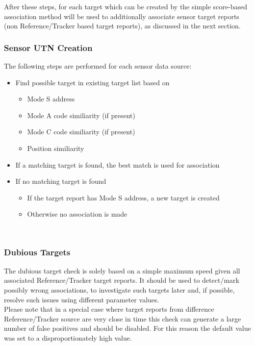 After these steps, for each target which can be created by the simple score-based association method will be used to additionally associate sensor target reports (non Reference/Tracker based target reports), as discussed in the next section.

\subsubsection{Sensor UTN Creation}



The following steps are performed for each sensor data source:
\begin{itemize}
\item Find possible target in existing target list based on
\begin{itemize}
\item Mode S address
\item Mode A code similiarity (if present)
\item Mode C code similiarity (if present)
\item Position similiarity
\end{itemize}
\item If a matching target is found, the best match is used for association
\item If no matching target is found
\begin{itemize}
\item If the target report has Mode S address, a new target is created
\item Otherwise no association is made
\end{itemize}
\end{itemize}
\ \\

\subsubsection{Dubious Targets}

The dubious target check is solely based on a simple maximum speed given all associated Reference/Tracker target reports. It should be used to detect/mark possibly wrong associations, to investigate such targets later and, if possible, resolve such issues using different parameter values. \\

Please note that in a special case where target reports from difference Reference/Tracker source are very close in time this check can generate a large number of false positives and should be disabled. For this reason the default value was set to a disproportionately high value.

